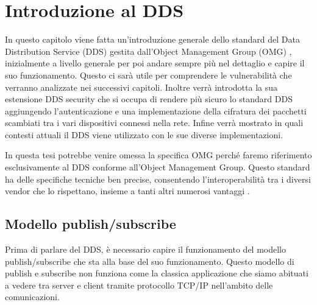 \chapter{Introduzione al DDS}
\label{introdDDS}

In questo capitolo viene fatta un'introduzione generale dello 
standard del Data Distribution Service (DDS) gestita
dall'Object Management Group (OMG) \cite{8469351},
inizialmente a livello generale 
per poi andare sempre più nel
dettaglio e capire il suo funzionamento. Questo ci sarà utile 
per comprendere le vulnerabilità che verranno analizzate nei
successivi capitoli. Inoltre verrà introdotta la sua estensione 
DDS security che si occupa di rendere più sicuro lo standard DDS 
aggiungendo l'autenticazione e una 
implementazione della cifratura dei pacchetti scambiati tra i vari
dispositivi connessi nella rete. 
Infine verrà mostrato in quali contesti attuali il DDS viene
utilizzato con le sue diverse implementazioni.

In questa tesi potrebbe venire omessa la specifica OMG perché 
faremo riferimento
esclusivamente al DDS conforme all'Object Management Group. Questo 
standard ha delle specifiche tecniche ben precise, consentendo
l'interoperabilità tra i diversi vendor che lo rispettano, insieme
a tanti altri numerosi vantaggi \cite{dds1.4}.


\section{Modello publish/subscribe}
Prima di parlare del DDS, è necessario capire il 
funzionamento del modello publish/subscribe
che sta alla base del suo funzionamento.
Questo modello di publish e subscribe non funziona come la 
classica applicazione che siamo abituati a vedere tra server e
client tramite protocollo TCP/IP nell'ambito delle comunicazioni. 


